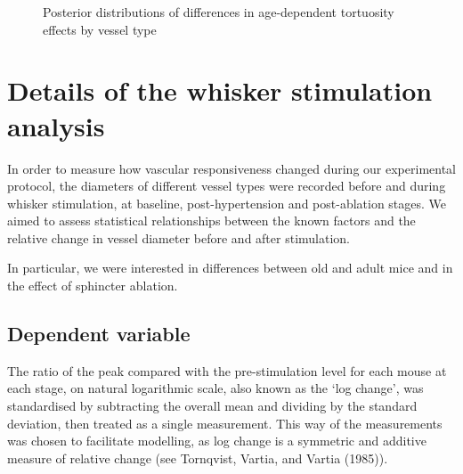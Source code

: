 \documentclass[
  letterpaper,
  DIV=11,
  numbers=noendperiod,
  oneside]{scrartcl}
\theoremstyle{plain}
\theoremstyle{remark}
\begin{document}
\begin{figure}


\caption{\label{fig-tortuosity-effects}Posterior distributions of
differences in age-dependent tortuosity effects by vessel type}

\end{figure}%

\section{Details of the whisker stimulation
analysis}\label{details-of-the-whisker-stimulation-analysis}

In order to measure how vascular responsiveness changed during our
experimental protocol, the diameters of different vessel types were
recorded before and during whisker stimulation, at baseline,
post-hypertension and post-ablation stages. We aimed to assess
statistical relationships between the known factors and the relative
change in vessel diameter before and after stimulation.

In particular, we were interested in differences between old and adult
mice and in the effect of sphincter ablation.

\subsection{Dependent variable}\label{dependent-variable}

The ratio of the peak compared with the pre-stimulation level for each
mouse at each stage, on natural logarithmic scale, also known as the
`log change', was standardised by subtracting the overall mean and
dividing by the standard deviation, then treated as a single
measurement. This way of the measurements was chosen to facilitate
modelling, as log change is a symmetric and additive measure of relative
change (see Tornqvist, Vartia, and Vartia (1985)).
\end{document}
